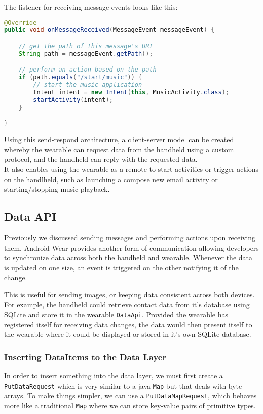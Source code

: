 The listener for receiving message events looks like this:

\begin{lstlisting}[language=Java]
@Override
public void onMessageReceived(MessageEvent messageEvent) {

    // get the path of this message's URI
    String path = messageEvent.getPath();

    // perform an action based on the path
    if (path.equals("/start/music")) {
        // start the music application
        Intent intent = new Intent(this, MusicActivity.class);
        startActivity(intent);
    }

}
\end{lstlisting}

Using this send-respond architecture, a client-server model can be created
whereby the wearable can request data from the handheld using a custom
protocol, and the handheld can reply with the requested data.\\
It also enables using the wearable as a remote to start activities or trigger
actions on the handlheld, such as launching a compose new email activity or
starting/stopping music playback.

\subsection{Data API}
Previously we discussed sending messages and performing actions upon receiving
them. Android Wear provides another form of communication allowing developers
to synchronize data across both the handheld and wearable. Whenever the data is
updated on one size, an event is triggered on the other notifying it of the
change.

This is useful for sending images, or keeping data consistent across both
devices. For example, the handheld could retrieve contact data from it's
database using SQLite and store it in the wearable \texttt{DataApi}. Provided
the wearable has registered itself for receiving data changes, the data would
then present itself to the wearable where it could be displayed or stored in
it's own SQLite database.

\subsubsection{Inserting DataItems to the Data Layer}
In order to insert something into the data layer, we must first create a
\texttt{PutDataRequest} which is very similar to a java \texttt{Map} but that
deals with byte arrays. To make things simpler, we can use a
\texttt{PutDataMapRequest}, which behaves more like a traditional \texttt{Map}
where we can store key-value pairs of primitive types.

